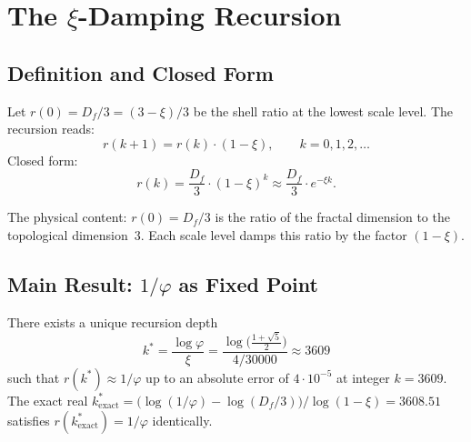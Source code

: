\section{The $\xi$-Damping Recursion}

\subsection{Definition and Closed Form}

\begin{definition}\label{def:rec275en}
Let $r(0) = D_f/3 = (3-\xi)/3$ be the shell ratio at the lowest scale level.
The recursion reads:
\begin{equation}
  r(k+1) = r(k)\cdot(1-\xi), \qquad k = 0,1,2,\ldots
  \label{eq:rec275en}
\end{equation}
Closed form:
\begin{equation}
  r(k) = \frac{D_f}{3}\cdot(1-\xi)^k \approx \frac{D_f}{3}\cdot e^{-\xi k}.
  \label{eq:closed275en}
\end{equation}
\end{definition}

The physical content: $r(0) = D_f/3$ is the ratio of the fractal
dimension to the topological dimension~3. Each scale level damps this
ratio by the factor $(1-\xi)$.

\subsection{Main Result: $1/\varphi$ as Fixed Point}

\begin{theorem}\label{thm:fixpoint275en}
There exists a unique recursion depth
\begin{equation}
  \boxed{k^* = \frac{\log\varphi}{\xi}
      = \frac{\log\!\bigl(\tfrac{1+\sqrt{5}}{2}\bigr)}{4/30000}
      \approx 3609}
  \label{eq:kstar275en}
\end{equation}
such that $r(k^*) \approx 1/\varphi$ up to an absolute error of $4{\cdot}10^{-5}$ at integer $k=3609$. The exact real $k^*_\mathrm{exact} = \bigl(\log(1/\varphi)-\log(D_f/3)\bigr)/\log(1-\xi) = 3608.51$ satisfies $r(k^*_\mathrm{exact}) = 1/\varphi$ identically.
\end{theorem}

